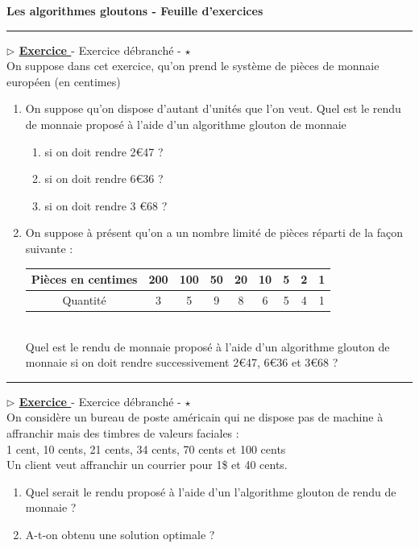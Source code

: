 \documentclass[12pt,french]{article}
\newcounter{npb}
\newcommand{\exo}{
    \stepcounter{npb}
    {\textbf{$\triangleright$ \underline{Exercice \arabic{npb} }}}
}
\newcounter{sf}
\begin{document}
    \chead{}
      \renewcommand{\headrulewidth}{0.5pt}
      \lfoot{                      }
    \pagestyle{fancy}
    \renewcommand{\footrulewidth}{0.4pt}
\begin{center}
\textbf{\Large{Les algorithmes gloutons - Feuille d'exercices   }}\end{center}
\hrule
\bigskip
\exo  - Exercice débranché - $\star$ \\
On suppose dans cet exercice, qu'on prend le système de pièces de monnaie européen (en centimes)
\begin{enumerate}
	\item On suppose qu'on dispose d'autant d'unités que l'on veut.  Quel est le rendu de monnaie proposé à l'aide d'un algorithme glouton de monnaie 
	\begin{enumerate}
		\item si on doit rendre 2\euro 47 ?
		\item si on doit rendre 6\euro 36 ?
		\item si on doit rendre 3 \euro 68 ?
	\end{enumerate}
\item On suppose à présent qu'on a un nombre limité de pièces réparti de la façon suivante :\\
\begin{tabular}{|c|c|c|c|c|c|c|c|c|}
	\hline
	Pièces en centimes&200&100&50&20&10&5&2&1\\
	\hline
	Quantité&3&5&9&8&6&5&4&1\\
	\hline
	\end{tabular}\\
 Quel est le rendu de monnaie proposé à l'aide d'un algorithme glouton de monnaie si on doit rendre successivement 2\euro 47, 6\euro 36 et 3\euro 68 ? 

\end{enumerate}
\hrule
\medskip
\exo - Exercice débranché - $\star$ \\
On considère un bureau de poste américain qui ne dispose pas de machine à affranchir mais des timbres de valeurs faciales :\\
1 cent, 10 cents, 21 cents, 34 cents, 70 cents et 100 cents\\
Un client veut affranchir un courrier pour 1\$ et 40 cents.
\begin{enumerate}
	\item Quel serait le rendu proposé à l'aide d'un l'algorithme glouton de rendu de monnaie ? 
	\item A-t-on obtenu une solution optimale ? 
\end{enumerate}
\end{document}
